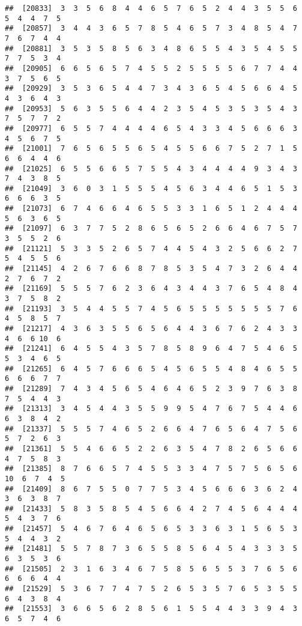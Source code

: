 \documentclass[
]{book}
\begin{document}
\begin{verbatim}
##  [20833]  3  3  5  6  8  4  4  6  5  7  6  5  2  4  4  3  5  5  6  5  4  4  7  5
##  [20857]  3  4  4  3  6  5  7  8  5  4  6  5  7  3  4  8  5  4  7  7  6  7  4  4
##  [20881]  3  5  3  5  8  5  6  3  4  8  6  5  5  4  3  5  4  5  5  7  7  5  3  4
##  [20905]  6  6  5  6  5  7  4  5  5  2  5  5  5  5  6  7  7  4  4  3  7  5  6  5
##  [20929]  3  5  3  6  5  4  4  7  3  4  3  6  5  4  5  6  6  4  5  4  3  6  4  3
##  [20953]  5  6  3  5  5  6  4  4  2  3  5  4  5  3  5  3  5  4  3  7  5  7  7  2
##  [20977]  6  5  5  7  4  4  4  4  6  5  4  3  3  4  5  6  6  6  3  4  5  6  7  5
##  [21001]  7  6  5  6  5  5  6  5  4  5  5  6  6  7  5  2  7  1  5  6  6  4  4  6
##  [21025]  6  5  5  6  6  5  7  5  5  4  3  4  4  4  4  9  3  4  3  7  4  3  8  5
##  [21049]  3  6  0  3  1  5  5  5  4  5  6  3  4  4  6  5  1  5  3  6  6  6  3  5
##  [21073]  6  7  4  6  6  4  6  5  5  3  3  1  6  5  1  2  4  4  4  5  6  3  6  5
##  [21097]  6  3  7  7  5  2  8  6  5  6  5  2  6  6  4  6  7  5  7  3  5  5  2  6
##  [21121]  5  3  3  5  2  6  5  7  4  4  5  4  3  2  5  6  6  2  7  5  4  5  5  6
##  [21145]  4  2  6  7  6  6  8  7  8  5  3  5  4  7  3  2  6  4  4  2  7  6  7  2
##  [21169]  5  5  5  7  6  2  3  6  4  3  4  4  3  7  6  5  4  8  4  3  7  5  8  2
##  [21193]  3  5  4  4  5  5  7  4  5  6  5  5  5  5  5  5  5  7  6  4  5  8  5  7
##  [21217]  4  3  6  3  5  5  6  5  6  4  4  3  6  7  6  2  4  3  3  4  6  6 10  6
##  [21241]  6  4  5  5  4  3  5  7  8  5  8  9  6  4  7  5  4  6  5  5  3  4  6  5
##  [21265]  6  4  5  7  6  6  6  5  4  5  6  5  5  4  8  4  6  5  5  6  6  6  7  7
##  [21289]  7  4  3  4  5  6  5  4  6  4  6  5  2  3  9  7  6  3  8  7  5  4  4  3
##  [21313]  3  4  5  4  4  3  5  5  9  9  5  4  7  6  7  5  4  4  6  6  3  8  4  2
##  [21337]  5  5  5  7  4  6  5  2  6  6  4  7  6  5  6  4  7  5  6  5  7  2  6  3
##  [21361]  5  5  4  6  6  5  2  2  6  3  5  4  7  8  2  6  5  6  6  4  7  5  8  3
##  [21385]  8  7  6  6  5  7  4  5  5  3  3  4  7  5  7  5  6  5  6 10  6  7  4  5
##  [21409]  8  6  7  5  5  0  7  7  5  3  4  5  6  6  6  3  6  2  4  3  6  3  8  7
##  [21433]  5  8  3  5  8  5  4  5  6  6  4  2  7  4  5  6  4  4  4  5  4  3  7  6
##  [21457]  5  4  6  7  6  4  6  5  6  5  3  3  6  3  1  5  6  5  3  5  4  4  3  2
##  [21481]  5  5  7  8  7  3  6  5  5  8  5  6  4  5  4  3  3  3  5  6  3  5  3  6
##  [21505]  2  3  1  6  3  4  6  7  5  8  5  6  5  5  3  7  6  5  6  6  6  6  4  4
##  [21529]  5  3  6  7  7  4  7  5  2  6  5  3  5  7  6  5  3  5  5  6  4  3  8  4
##  [21553]  3  6  6  5  6  2  8  5  6  1  5  5  4  4  3  3  9  4  3  6  5  7  4  6

\end{verbatim}
\end{document}
